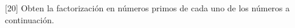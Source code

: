 [20] Obten la factorización en n\'umeros primos de cada uno de los n\'umeros a continuaci\'on.
\begin{multicols}{2}

    \begin{parts}
        {\printanswers
            
        }
        
        
        
        
        
        
        
        
        
    \end{parts}
\end{multicols}